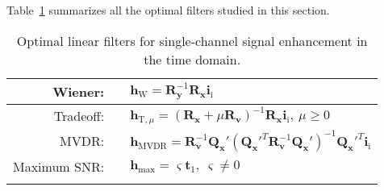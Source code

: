 \documentclass[10pt,pdflatex,headrule,landscape]{beamer}
\begin{document}
\begin{frame}[allowframebreaks]

Table~\ref{C2-table-Opt-Filts} summarizes all the optimal filters studied in this section.

\begin{table}[t!]
\centering \caption{\footnotesize Optimal linear filters for single-channel signal enhancement in the time domain.}
\label{C2-table-Opt-Filts} {
\renewcommand{\arraystretch}{1.4}
\begin{tabular}{rcl}
\hline\noalign{\smallskip}
 Wiener: & & $\displaystyle \mathbf{h}_{\mathrm{W}} = \mathbf{R}_{\mathbf{y}}^{-1} \mathbf{R}_{\mathbf{x}} \mathbf{i}_{\mathrm{i}}$ \\ \hline
 Tradeoff: & & $\displaystyle \mathbf{h}_{\mathrm{T},\mu} = \left( \mathbf{R}_{\mathbf{x}} + \mu \mathbf{R}_{\mathbf{v}} \right)^{-1}
 \mathbf{R}_{\mathbf{x}} \mathbf{i}_{\mathrm{i}}, \ \mu \geq 0$ \\ \hline
 MVDR: & & $\displaystyle \mathbf{h}_{\mathrm{MVDR}} =
 \mathbf{R}_{\mathbf{v}}^{-1} \mathbf{Q}_{\mathbf{x}}' \left( \mathbf{Q}_{\mathbf{x}}'^T
 \mathbf{R}_{\mathbf{v}}^{-1} \mathbf{Q}_{\mathbf{x}}' \right)^{-1} \mathbf{Q}_{\mathbf{x}}'^T \mathbf{i}_{\mathrm{i}}$ \\ \hline
 Maximum SNR: & & $\displaystyle \mathbf{h}_{\mathrm{max}} = \varsigma \mathbf{t}_1 , \ \varsigma \neq 0$ \\ \hline
 \noalign{\smallskip}\hline
\end{tabular} }
\end{table}

\end{frame}
\end{document}
